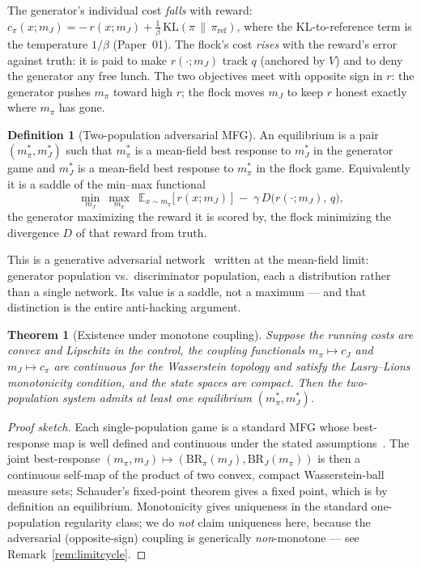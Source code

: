 \documentclass[11pt]{article}
\newtheorem{theorem}{Theorem}
\theoremstyle{definition}
\newtheorem{definition}{Definition}
\theoremstyle{remark}
\newcommand{\E}{\mathbb{E}}
\newcommand{\mpi}{m_{\pi}}
\newcommand{\mJ}{m_{J}}
\begin{document}
The generator's individual cost \emph{falls} with reward:
$c_\pi(x;\mJ) = -\,r(x;\mJ) + \tfrac1\beta\,\mathrm{KL}(\pi\,\|\,\pi_{\text{ref}})$, where the KL-to-reference
term is the temperature $1/\beta$ (Paper~01). The flock's cost \emph{rises} with the reward's error against
truth: it is paid to make $r(\cdot;\mJ)$ track $q$ (anchored by $V$) and to deny the generator any free
lunch. The two objectives meet with opposite sign in $r$: the generator pushes $\mpi$ toward high $r$; the
flock moves $\mJ$ to keep $r$ honest exactly where $\mpi$ has gone.

\begin{definition}[Two-population adversarial MFG]
An equilibrium is a pair $(\mpi^\ast,\mJ^\ast)$ such that $\mpi^\ast$ is a mean-field best response to
$\mJ^\ast$ in the generator game and $\mJ^\ast$ is a mean-field best response to $\mpi^\ast$ in the flock
game. Equivalently it is a saddle of the min--max functional
\[
  \min_{\mJ}\ \max_{\mpi}\ \; \E_{x\sim\mpi}\big[\,r(x;\mJ)\,\big]\;-\;\gamma\, D\big(r(\cdot;\mJ),\,q\big),
\]
the generator maximizing the reward it is scored by, the flock minimizing the divergence $D$ of that reward
from truth.
\end{definition}

This is a generative adversarial network~\cite{goodfellow2014gan} written at the mean-field limit:
generator population vs.\ discriminator population, each a distribution rather than a single network. Its
value is a saddle, not a maximum --- and that distinction is the entire anti-hacking argument.

\begin{theorem}[Existence under monotone coupling]
\label{thm:existence}
Suppose the running costs are convex and Lipschitz in the control, the coupling functionals
$\mpi\mapsto c_J$ and $\mJ\mapsto c_\pi$ are continuous for the Wasserstein topology and satisfy the
Lasry--Lions monotonicity condition, and the state spaces are compact. Then the two-population system
admits at least one equilibrium $(\mpi^\ast,\mJ^\ast)$.
\end{theorem}

\begin{proof}[Proof sketch]
Each single-population game is a standard MFG whose best-response map is well defined and continuous under
the stated assumptions~\cite{lasry2007mfg}. The joint best-response
$(\mpi,\mJ)\mapsto(\mathrm{BR}_\pi(\mJ),\mathrm{BR}_J(\mpi))$ is then a continuous self-map of the product
of two convex, compact Wasserstein-ball measure sets; Schauder's fixed-point theorem gives a fixed point,
which is by definition an equilibrium. Monotonicity gives uniqueness in the standard one-population
regularity class; we do \emph{not} claim uniqueness here, because the adversarial (opposite-sign) coupling
is generically \emph{non}-monotone --- see Remark~\ref{rem:limitcycle}.
\end{proof}
\end{document}
